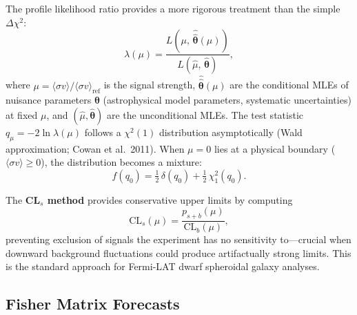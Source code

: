 \documentclass[10pt,a4paper]{article}
\newcommand{\sigmav}{\langle\sigma v\rangle}
\begin{document}
The profile likelihood ratio provides a more rigorous treatment than the simple $\Delta\chi^2$:
\begin{equation}
\lambda(\mu) = \frac{L(\mu,\, \hat{\hat{\bm{\theta}}}(\mu))}
{L(\hat{\mu},\, \hat{\bm{\theta}})},
\label{eq:profile_lr}
\end{equation}
where $\mu = \sigmav / \sigmav_{\mathrm{ref}}$ is the signal strength, $\hat{\hat{\bm{\theta}}}(\mu)$ are the conditional MLEs of nuisance parameters $\bm{\theta}$ (astrophysical model parameters, systematic uncertainties) at fixed $\mu$, and $(\hat{\mu}, \hat{\bm{\theta}})$ are the unconditional MLEs. The test statistic $q_\mu = -2\ln\lambda(\mu)$ follows a $\chi^2(1)$ distribution asymptotically (Wald approximation; Cowan et al.\ 2011). When $\mu = 0$ lies at a physical boundary ($\sigmav \geq 0$), the distribution becomes a mixture:
\begin{equation}
f(q_0) = \tfrac{1}{2}\,\delta(q_0) + \tfrac{1}{2}\,\chi^2_1(q_0).
\end{equation}

The \textbf{CL$_s$ method} provides conservative upper limits by computing
\begin{equation}
\mathrm{CL}_s(\mu) = \frac{p_{s+b}(\mu)}{\mathrm{CL}_b(\mu)},
\end{equation}
preventing exclusion of signals the experiment has no sensitivity to---crucial when downward background fluctuations could produce artifactually strong limits. This is the standard approach for Fermi-LAT dwarf spheroidal galaxy analyses.


\subsection{Fisher Matrix Forecasts}
\end{document}
